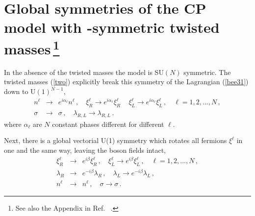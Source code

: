 \documentclass[epsfig,12pt]{article}
\def\beqn{\begin{eqnarray}}
\def\eeqn{\end{eqnarray}}
\renewcommand{\theequation}{\thesection.\arabic{equation}}
\def\beqn{\begin{eqnarray}}
\def\eeqn{\end{eqnarray}}
\renewcommand{\theequation}{\thesection.\arabic{equation}}
\begin{document}
{\section
[Global symmetries of the CP\boldmath{$(N-1)$} model with \boldmath{$Z_{N}$}-symmetric
 twisted masses]
{Global symmetries of the CP model with -symmetric
 twisted masses\,\footnote{See also the Appendix in Ref.~ \cite{Shifman:2009ay}.}}
 \renewcommand{\theequation}{\Alph{section}.\arabic{equation}}
\setcounter{equation}{0}
 \renewcommand{\thesubsection}{\Alph{section}.\arabic{subsection}}
\setcounter{subsection}{0}
% 
\label{app:symm}

 In the absence of the twisted masses
the model is SU$(N)$ symmetric. The twisted masses (\ref{two}) explicitly break this symmetry 
of the Lagrangian (\ref{bee31}) down to U$(1)^{N-1}$,
\beqn
n^\ell&\to& e^{i\alpha_\ell}n^\ell\,,\quad \xi^\ell_R \to e^{i\alpha_\ell}\xi^\ell_R\,
\quad \xi^\ell_L \to e^{i\alpha_\ell}\xi^\ell_L\,,\quad \ell=1,2, ..., N\,,
\nonumber\\[2mm]
\sigma
&\to&
 \sigma\,,\quad \lambda_{R,L}\to \lambda_{R,L}\,.
 \label{appe9}
\eeqn
where $\alpha_\ell$ are $N$ constant phases different for different $\ell$. 

Next, there is a global vectorial U(1) symmetry which rotates all fermions $\xi^\ell$
in one and the same way, leaving the boson fields intact,
\beqn
\xi^\ell_R 
&\to& 
e^{i\beta}\xi^\ell_R\,, \quad
 \xi^\ell_L \to e^{i\beta}\xi^\ell_L\,,\quad \ell=1,2, ..., N\,,
\nonumber\\[2mm]
\lambda_R 
&\to&
 e^{-i\beta}\lambda_R\,,\quad 
\lambda_L \to e^{-i\beta}\lambda_L\,,
\nonumber\\[2mm]
n^\ell &\to& n^\ell\,,\quad \sigma\to\sigma\,.
\label{appeten}
\eeqn

}
\end{document}

